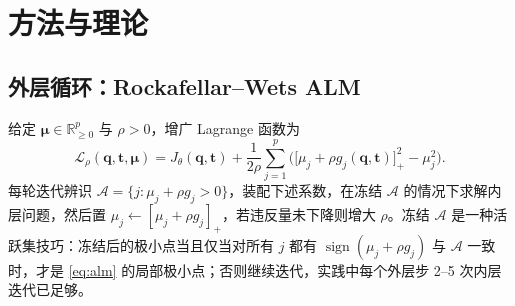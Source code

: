 \section{方法与理论}\label{sec:method}

\subsection{外层循环：Rockafellar--Wets ALM}\label{sec:alm}
给定 $\boldsymbol\mu\in\mathbb{R}^p_{\ge0}$ 与 $\rho>0$，增广 Lagrange 函数为
\begin{equation}
\mathcal L_\rho(\mathbf q,\mathbf t,\boldsymbol\mu)=J_\theta(\mathbf q,\mathbf t)+\frac{1}{2\rho}\sum_{j=1}^p\Big(\big[\mu_j+\rho g_j(\mathbf q,\mathbf t)\big]_+^2-\mu_j^2\Big).
\label{eq:alm}
\end{equation}
每轮迭代辨识 $\mathcal A=\{j:\mu_j+\rho g_j>0\}$，装配下述系数，在冻结 $\mathcal A$ 的情况下求解内层问题，然后置 $\mu_j\leftarrow[\mu_j+\rho g_j]_+$，若违反量未下降则增大 $\rho$。冻结 $\mathcal A$ 是一种活跃集技巧：冻结后的极小点当且仅当对所有 $j$ 都有 $\operatorname{sign}(\mu_j+\rho g_j)$ 与 $\mathcal A$ 一致时，才是 \eqref{eq:alm} 的局部极小点；否则继续迭代，实践中每个外层步 2--5 次内层迭代已足够。

